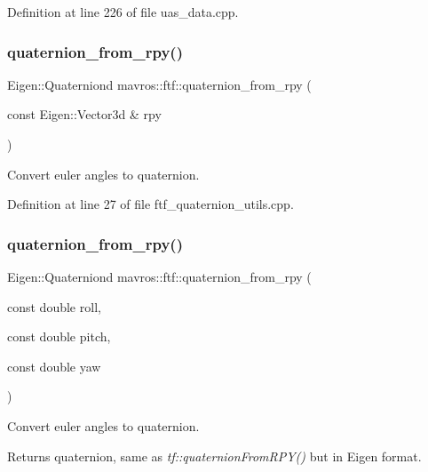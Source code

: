 Definition at line 226 of file uas\+\_\+data.\+cpp.

\mbox{\label{group__nodelib_ga1f1d174745db801a82766fa0839b17e1}} 
\subsubsection{\texorpdfstring{quaternion\_from\_rpy()}{quaternion\_from\_rpy()}\hspace{0.1cm}{\footnotesize\ttfamily [1/2]}}
{\footnotesize\ttfamily Eigen\+::\+Quaterniond mavros\+::ftf\+::quaternion\+\_\+from\+\_\+rpy (\begin{DoxyParamCaption}\item[{const Eigen\+::\+Vector3d \&}]{rpy }\end{DoxyParamCaption})}



Convert euler angles to quaternion. 



Definition at line 27 of file ftf\+\_\+quaternion\+\_\+utils.\+cpp.

\mbox{\label{group__nodelib_ga97ccf75c02bae67e6fa6fd98b804d735}} 
\subsubsection{\texorpdfstring{quaternion\_from\_rpy()}{quaternion\_from\_rpy()}\hspace{0.1cm}{\footnotesize\ttfamily [2/2]}}
{\footnotesize\ttfamily Eigen\+::\+Quaterniond mavros\+::ftf\+::quaternion\+\_\+from\+\_\+rpy (\begin{DoxyParamCaption}\item[{const double}]{roll,  }\item[{const double}]{pitch,  }\item[{const double}]{yaw }\end{DoxyParamCaption})\hspace{0.3cm}{\ttfamily [inline]}}



Convert euler angles to quaternion. 

\begin{DoxyReturn}{Returns}
quaternion, same as {\itshape tf\+::quaternion\+From\+R\+P\+Y()} but in Eigen format. 
\end{DoxyReturn}


